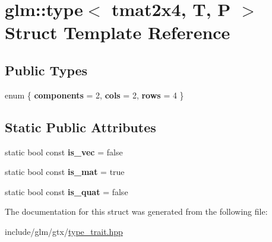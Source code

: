 \hypertarget{structglm_1_1type_3_01tmat2x4_00_01T_00_01P_01_4}{}\section{glm\+:\+:type$<$ tmat2x4, T, P $>$ Struct Template Reference}
\label{structglm_1_1type_3_01tmat2x4_00_01T_00_01P_01_4}
\subsection*{Public Types}
\begin{DoxyCompactItemize}
\item 
\mbox{\label{structglm_1_1type_3_01tmat2x4_00_01T_00_01P_01_4_a79166c6c334553539456318521961a11}} 
enum \{ {\bfseries components} = 2, 
{\bfseries cols} = 2, 
{\bfseries rows} = 4
 \}
\end{DoxyCompactItemize}
\subsection*{Static Public Attributes}
\begin{DoxyCompactItemize}
\item 
\mbox{\label{structglm_1_1type_3_01tmat2x4_00_01T_00_01P_01_4_a54a0dba0959b7ee6af5f60fc68125ca1}} 
static bool const {\bfseries is\+\_\+vec} = false
\item 
\mbox{\label{structglm_1_1type_3_01tmat2x4_00_01T_00_01P_01_4_a957db726929de0402246a54984cdea2a}} 
static bool const {\bfseries is\+\_\+mat} = true
\item 
\mbox{\label{structglm_1_1type_3_01tmat2x4_00_01T_00_01P_01_4_ab96ca1c8861fb97ab0bfa9a44d8a389c}} 
static bool const {\bfseries is\+\_\+quat} = false
\end{DoxyCompactItemize}


The documentation for this struct was generated from the following file\+:\begin{DoxyCompactItemize}
\item 
include/glm/gtx/\hyperlink{type__trait_8hpp}{type\+\_\+trait.\+hpp}\end{DoxyCompactItemize}
